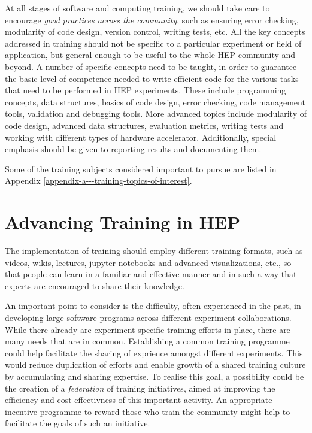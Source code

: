 \documentclass[12pt,a4paper]{article}
\begin{document}
At all stages of software and computing training, we should take care to
encourage \emph{good practices across the community}, such as ensuring error
checking, modularity of code design, version control, writing tests, etc. All
the key concepts addressed in training should not be specific to a particular
experiment or field of application, but general enough to be useful to the whole
HEP community and beyond. A number of specific concepts need to be taught, in
order to guarantee the basic level of competence needed to write efficient code
for the various tasks that need to be performed in HEP experiments.
These include
programming concepts, data structures, basics of code design, error checking,
code management tools, validation and debugging tools. More advanced topics
include modularity of code design, advanced data structures, evaluation metrics,
writing tests and working with different types of hardware accelerator.
Additionally, special emphasis should be given to
reporting results and documenting them.

Some of the training subjects considered important to pursue are
listed in Appendix \ref{appendix-a---training-topics-of-interest}.


\section{Advancing Training in HEP}

The implementation of training should employ different training formats, such as
videos, wikis, lectures, jupyter notebooks and advanced visualizations, etc.,
so that people can learn in a familiar and effective manner and in such a way
that experts are encouraged to share their knowledge.

An important point to consider is the difficulty, often experienced in the past,
in developing large software programs across different experiment
collaborations.
While there already are experiment-specific training efforts in place, there are
many needs that are in common. Establishing a common training programme could
help facilitate the sharing of exprience amongst different experiments. This
would reduce duplication of efforts and enable growth of a shared training
culture by accumulating and sharing expertise.
To realise this goal, a possibility could be the creation of a
\emph{federation} of training initiatives,
aimed at improving the efficiency and cost-effectivness of this important
activity. An appropriate incentive programme to reward those who train the community
might help to facilitate the goals of such an initiative.
\end{document}
